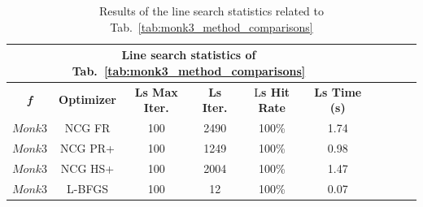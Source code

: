 \documentclass[11pt]{article}
\begin{document}
\begin{table}[H]
\small
    \centering
    \begin{tabular}{ |c|c|c|c|c|c|c|c|c|c|}
    \hline
     \multicolumn{6}{|c|}{\textbf{Line search statistics of Tab.~\ref{tab:monk3_method_comparisons}}} \\
      \hline
       \textbf{\textit{f}} & \textbf{Optimizer} & \textbf{Ls Max Iter.} &  \textbf{Ls Iter.} & L\textbf{s Hit Rate} & \textbf{Ls Time (s)}\\
     \hline
      $Monk3$ & NCG FR & 100 & 2490 & 100\%  & 1.74 \\
      \hline
      $Monk3$ & NCG PR+ & 100 & 1249 & 100\%  & 0.98 \\
      \hline
      $Monk3$ & NCG HS+ & 100 & 2004 & 100\%  & 1.47\\
      \hline
      $Monk3$ & L-BFGS & 100 & 12 & 100\%  & 0.07 \\
      \hline
    \end{tabular}
    \caption{Results of the line search statistics related to Tab.~\ref{tab:monk3_method_comparisons}}
    \label{tab:monk3_method_comparisons_ls}
\end{table}
\end{document}
